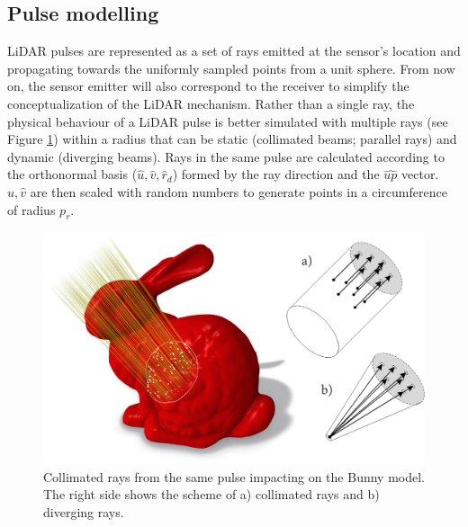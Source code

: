 \subsection{Pulse modelling}

LiDAR pulses are represented as a set of rays emitted at the sensor's location and propagating towards the uniformly sampled points from a unit sphere. From now on, the sensor emitter will also correspond to the receiver to simplify the conceptualization of the LiDAR mechanism. Rather than a single ray, the physical behaviour of a LiDAR pulse is better simulated with multiple rays \cite{zohdi_rapid_2020} (see Figure \ref{fig:pulse_radius_insight}) within a radius that can be static (collimated beams; parallel rays) and dynamic (diverging beams). Rays in the same pulse are calculated according to the orthonormal basis ($\hat{u}, \hat{v}, \hat{r}_{d}$) formed by the ray direction and the $\hat{\textit{up}}$ vector. $\hat{u}, \hat{v}$ are then scaled with random numbers to generate points in a circumference of radius $p_r$. 

\begin{figure}
	\centering
	\includegraphics[width=.8\linewidth]{figs/lidar_simulation/ray_section.png}
	\caption{Collimated rays from the same pulse impacting on the Bunny model. The right side shows the scheme of a) collimated rays and b) diverging rays.}
	\label{fig:pulse_radius_insight}
\end{figure}

